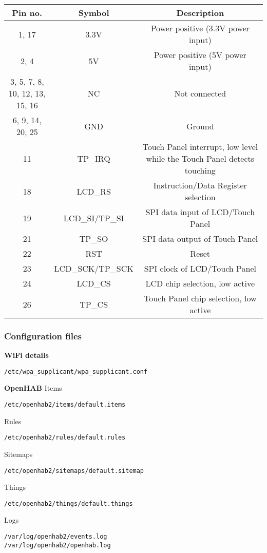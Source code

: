 \begin{tabular}{|c|c|c|}
\rowcolor{lightgray}
\hline
\textbf{Pin no.} & \textbf{Symbol} & \textbf{Description} \\
\hline
1, 17 & 3.3V & Power positive (3.3V power input) \\
\hline
2, 4 & 5V & Power positive (5V power input) \\
\hline
3, 5, 7, 8, 10, 12, 13, 15, 16 & NC & Not connected \\
\hline
6, 9, 14, 20, 25 & GND & Ground \\
\hline
11 & TP\_IRQ & Touch Panel interrupt, low level while the Touch Panel detects touching \\
\hline
18 & LCD\_RS & Instruction/Data Register selection \\
\hline
19 & LCD\_SI/TP\_SI & SPI data input of LCD/Touch Panel \\
\hline
21 & TP\_SO & SPI data output of Touch Panel \\
\hline
22 & RST & Reset \\
\hline
23 & LCD\_SCK/TP\_SCK & SPI clock of LCD/Touch Panel \\
\hline
24 & LCD\_CS & LCD chip selection, low active \\
\hline
26 & TP\_CS & Touch Panel chip selection, low active \\
\hline
\end{tabular}


\subsubsection{Configuration files}

\textbf{WiFi details}

\texttt{/etc/wpa\_supplicant/wpa\_supplicant.conf}

\textbf{OpenHAB}
Items

\texttt{/etc/openhab2/items/default.items}

Rules

\texttt{/etc/openhab2/rules/default.rules}

Sitemaps

\texttt{/etc/openhab2/sitemaps/default.sitemap}

Things

\texttt{/etc/openhab2/things/default.things}

Logs

\texttt{/var/log/openhab2/events.log\\
/var/log/openhab2/openhab.log}

